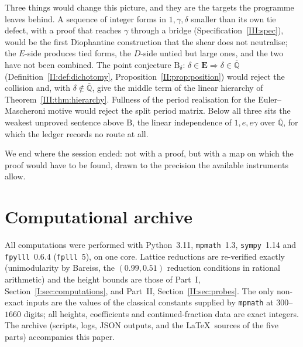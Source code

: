 \documentclass[11pt,a4paper]{article}
\newcommand{\Qbar}{\overline{\mathbb Q}}
\newcommand{\EE}{\mathbf E}
\theoremstyle{definition}
\theoremstyle{remark}
\numberwithin{equation}{section}
\begin{document}
Three things would change this picture, and they are the targets the programme leaves
behind. A sequence of integer forms in $1,\gamma,\delta$ smaller than its own tie defect,
with a proof that reaches $\gamma$ through a bridge (Specification~\ref{III:spec}), would
be the first Diophantine construction that the shear does not neutralise; the
$E$-side produces tied forms, the $D$-side untied but large ones, and the two have not
been combined. The point conjecture $\mathrm B_\delta$: $\delta\in\EE\Rightarrow\delta\in\Qbar$
(Definition~\ref{II:def:dichotomy}, Proposition~\ref{II:prop:position}) would reject the
collision and, with $\delta\notin\Qbar$, give the middle term of the linear hierarchy of
Theorem~\ref{III:thm:hierarchy}. Fullness of the period realisation for the
Euler--Mascheroni motive would reject the split period matrix. Below all three sits the
weakest unproved sentence above $\mathrm B$, the linear independence of $1,e,e\gamma$
over $\Qbar$, for which the ledger records no route at all.

We end where the session ended: not with a proof, but with a map on which the proof would
have to be found, drawn to the precision the available instruments allow.

\appendix

\section{Computational archive}\label{app:archive}

All computations were performed with Python~3.11, \texttt{mpmath}~1.3, \texttt{sympy}~1.14
and \texttt{fpylll}~0.6.4 (\texttt{fplll}~5), on one core. Lattice reductions are
re-verified exactly (unimodularity by Bareiss, the $(0.99,0.51)$ reduction conditions in
rational arithmetic) and the height bounds are those of Part~I, Section~\ref{I:sec:computations},
and Part~II, Section~\ref{II:sec:probes}. The only non-exact inputs are the values of the
classical constants supplied by \texttt{mpmath} at $300$--$1660$ digits; all heights,
coefficients and continued-fraction data are exact integers. The archive (scripts,
logs, JSON outputs, and the \LaTeX\ sources of the five parts) accompanies this paper.
\end{document}
